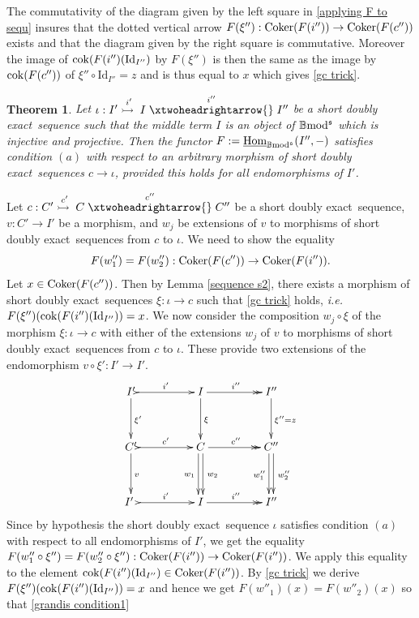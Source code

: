 \documentclass[12pt]{article}
\makeatletter
\newtheorem{thm}{Theorem}[section]
\def\Homi{{\underline{\rm Hom}}}
\def\id{{\rm id}}
\def\coker{{\rm Coker}}
\def\scoker{{\rm cok}}
\def\B{{\mathbb B}}
\def\exxx{{doubly exact}~}
\def\dar[#1]{\ar@<2pt>[#1]\ar@<-2pt>[#1]}
\newcommand{\ie}{{\it i.e.\/}\ }
\def\id{{\mbox{Id}}}
\def\b2{{\rm \B mod^{\mathfrak s}}}
\makeatother
\begin{document}
 The commutativity of the diagram given by the left square in \eqref{applying F to sequ} insures that the dotted vertical arrow $F(\xi''): \coker(F(i''))\to \coker(F(c''))$ exists and that the diagram given by the right square is commutative. Moreover the image of $\scoker(F(i'')(\id_{I''})$ by $F(\xi'')$  is then the same as the  image by $\scoker(F(c''))$ of $\xi''\circ \id_{I''}=z$ and is thus equal to $x$ which gives \eqref{gc trick}.\endproof 
 \begin{thm}\label{reduction toendo} Let $\iota:I'\stackrel{i'}{\rightarrowtail{}} I \stackrel{i''}{\xtwoheadrightarrow{}} I''$ be a short \exxx sequence such that the middle term $I$ is an object of $\b2$ which is {\em injective and projective}. 
Then the functor $F:=\Homi_\b2(I'',-)$ satisfies condition $(a)$  with respect to an arbitrary morphism of short \exxx sequences $c\to \iota$, provided this holds for all  endomorphisms of $I'$.
 \end{thm}
 \proof Let $c:C'\stackrel{c'}{\rightarrowtail{}} C \stackrel{c''}{\xtwoheadrightarrow{}} C''$ be a short \exxx sequence, $v:C'\to I'$ be a morphism, and $w_j$ be extensions of $v$ to morphisms of short \exxx sequences from $c$ to $\iota$. We need to show the equality 
 \begin{equation}\label{grandis condition1}
F(w''_1)=F(w''_2): \coker(F(c''))\to \coker(F(i'')).	
\end{equation} 
Let $x\in \coker(F(c''))$. Then by Lemma \ref{sequence s2},  there exists a morphism of short \exxx sequences $\xi:\iota\to c$ such that \eqref{gc trick} holds, \ie 
$F(\xi'')(\scoker(F(i'')(\id_{I''}))=x$. We now consider the composition $w_j\circ \xi$  of the morphism $\xi:\iota\to c$ with either of the extensions  $w_j$  of $v$ to morphisms of short \exxx sequences from $c$ to $\iota$. These provide two extensions of the endomorphism $v\circ \xi': I'\to I'$. 
 \begin{equation}\label{combinazione}
\xymatrix@C=20pt@R=35pt{
  I'\ar[d]^{\xi'}\ar@{>->}[rr]^{i'} && I \ar[d]^{\xi} \ar@{->>}[rr]^{i''}&& I''\ar[d]^{\xi''=z}
\\
C'\ar[d]^{v}\ar@{>->}[rr]^{c'} && C \dar[d]_{w_1}^{\ \, w_2} \ar@{->>}[rr]^{c''}&& C''\dar[d]_{w''_1}^{\ \, w''_2}
\\
I' \ \ar@{>->}[rr]^{i'}&& I \ar@{->>}[rr]^{i''}&& I''}
\end{equation}
 Since by hypothesis the short \exxx sequence $\iota$ satisfies condition $(a)$  with respect to  all  endomorphisms of $I'$, we get the equality $F(w''_1\circ \xi'')=F(w''_2\circ \xi''): \coker(F(i''))\to \coker(F(i''))$. We apply this equality to the element $\scoker(F(i'')(\id_{I''})\in \coker(F(i''))$. By \eqref{gc trick} we derive $F(\xi'')(\scoker(F(i'')(\id_{I''}))=x$ and hence we get $F(w''_1)(x)=F(w''_2)(x)$ so that \eqref{grandis condition1}
\end{document}
